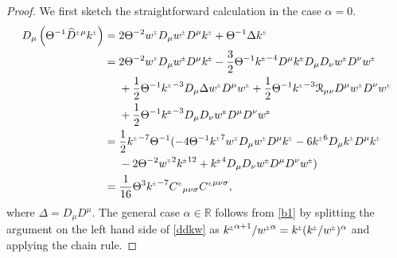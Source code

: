 \documentclass[a4paper,10pt,reqno]{amsart}
\newcommand{\cR}{\mathcal{R}}
\newcommand{\wh}{\widehat}
\newcommand{\Th}{\Theta}
\newcommand{\al}{\alpha}
\newcommand{\si}{\sigma}
\theoremstyle{plain}
\newcommand{\PM}[1]{{{#1}^{\hspace{-.5pt}\scaleto{\pm}{3.5pt}}}}
\newcommand{\MP}[1]{{{#1}^{\hspace{-.5pt}\scaleto{\mp}{3.5pt}}}}
\numberwithin{equation}{section}
\begin{document}
\begin{proof}
We  first sketch the straightforward calculation in the case $\al = 0$.
\begin{align} \label{b1} 
D_{\mu} \left( \Th^{-1}  \PM{\wh D}{}^{\mu} \PM{k} \right) 
={}& 2 \Th^{-2} \MP{w}D_{\mu} \PM{w} D^{\mu} \PM{k} + \Th^{-1} \Delta \PM{k}  \nonumber \\
={}& 2 \Th^{-2} \MP{w} D_{\mu} \PM{w} D^{\mu} \PM{k} -
\frac{3}{2} \Th^{-1} \PM{k}^{-4} D^{\mu} \PM{k} D_{\mu} D_{\nu} \PM{w} D^{\nu} \PM{w} \nonumber \\
& +\frac{1}{2} \Th^ {-1} \PM{k}^{-3} D_{\mu}\Delta \PM{w} D^{\mu} \PM{w} + 
\frac{1}{2} \Theta^{-1} \PM{k}^{-3} \cR_{\mu\nu} D^{\mu} \PM{w} D^{\nu} \PM{w} \nonumber \\
&  + \frac{1}{2} \Theta^{-1} \PM{k}^{-3}  D_{\mu}D_{\nu} \PM{w}D^{\mu} D^{\nu} \PM{w}  \nonumber \\
={}& \frac{1}{2} \PM{k}^{-7} \Theta^ {-1} (-4 \Theta^{-1} \PM{k}^7 \MP{w} D_{\mu} \PM{w} D^{\mu} \PM{k} - 
6 \PM{k}^6  D_{\mu} \PM{k} D^{\mu} \PM{k}  \nonumber  \\
&  - 2 \Theta^{-2} \MP{w}^2 \PM{k}^{12} + \PM{k}^4 D_{\mu} D_{\nu} \PM{w} D^{\mu} D^{\nu} \PM{w} ) 
 \nonumber \\
={}& \frac{1}{16} \Theta^3 \PM{k}^{-7} \PM{C}_{\mu\nu\si} \PM{C}^{\mu\nu\si},
\end{align}
where $ \Delta = D_{\mu} D^{\mu}$. The general case  $\al \in \mathbb{R}$ follows from \eqref{b1} by splitting the argument on the left hand side of \eqref{ddkw} as $\PM{k}^{\al + 1} / \PM{w}^{\al} =  \PM{k} (\PM{k} / \PM{w})^{\al}$ and applying the chain rule.
\end{proof} 
\end{document}
